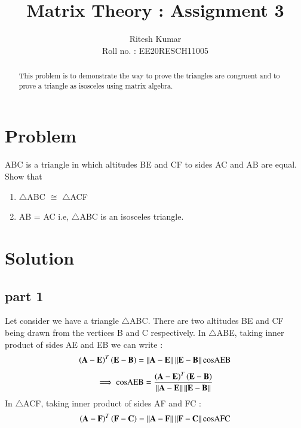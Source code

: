 \documentclass[journal,12pt,twocolumn]{IEEEtran}
\begin{document}
     \def\rightbox#1{\makebox[0in][r]{#1}}
     \def\centbox#1{\makebox[0in]{#1}}
     \def\topbox#1{\raisebox{-\baselineskip}[0in][0in]{#1}}
     \def\midbox#1{\raisebox{-0.5\baselineskip}[0in][0in]{#1}}
\vspace{3cm}
\title{ Matrix Theory : Assignment 3 }
\author{Ritesh Kumar \\ Roll no. : EE20RESCH11005 }
\maketitle
\newpage
\bigskip
\renewcommand{\thefigure}{\theenumi}
\renewcommand{\thetable}{\theenumi}
\begin{abstract}
This problem is to demonstrate the way to prove the triangles are congruent and to prove a triangle as isosceles using matrix algebra.
\end{abstract}

\section{Problem}
ABC is a triangle in which altitudes BE and CF to sides AC and AB are equal. Show that 
\begin{enumerate}
	\item $\triangle$ABC $\cong$ $\triangle$ACF 
	\item AB = AC  i.e, $\triangle$ABC is an isosceles triangle.
\end{enumerate}
\section{Solution}
\subsection{part 1}
Let consider we have a triangle $\triangle$ABC. There are two altitudes BE and CF being  drawn from the vertices B and C respectively. \newline
 In $\triangle$ABE, taking inner product of sides  AE and EB we can write :
\begin{align}
\left( \mathbf{A-E} \right)^T \left( \mathbf{E - B} \right) = \left\lVert\mathbf{A - E}\right\rVert \left\lVert\mathbf{ E - B}\right\rVert \text{cosAEB}
\end{align}
\begin{align}
\implies \text{cosAEB} = \frac{\left( \mathbf{A-E} \right)^T  \left( \mathbf{E - B } \right)}{\left\lVert\mathbf{A - E}\right\rVert \left\lVert\mathbf{E - B}\right\rVert}
\end{align}
In $\triangle$ACF, taking inner product of sides AF and FC :
\begin{align}
\left( \mathbf{A-F} \right)^T \left( \mathbf{F - C} \right) = \left\lVert\mathbf{A - F}\right\rVert \left\lVert\mathbf{ F - C}\right\rVert \text{cosAFC}
\end{align}
\end{document}
